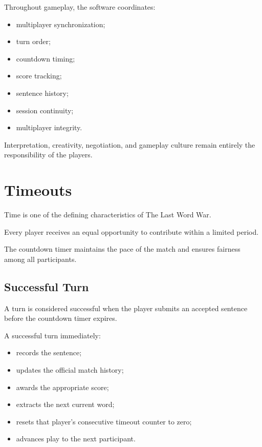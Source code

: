 \documentclass[11pt,a4paper]{article}
\begin{document}
Throughout gameplay, the software coordinates:

\begin{itemize}
    \item multiplayer synchronization;
    \item turn order;
    \item countdown timing;
    \item score tracking;
    \item sentence history;
    \item session continuity;
    \item multiplayer integrity.
\end{itemize}

Interpretation, creativity, negotiation, and gameplay culture remain entirely the responsibility of the players.

\section{Timeouts}
\label{sec:timeouts}

Time is one of the defining characteristics of The Last Word War\texttrademark.

Every player receives an equal opportunity to contribute within a limited period.

The countdown timer maintains the pace of the match and ensures fairness among all participants.

\subsection{Successful Turn}

A turn is considered successful when the player submits an accepted sentence before the countdown timer expires.

A successful turn immediately:

\begin{itemize}
    \item records the sentence;
    \item updates the official match history;
    \item awards the appropriate score;
    \item extracts the next current word;
    \item resets that player's consecutive timeout counter to zero;
    \item advances play to the next participant.
\end{itemize}
\end{document}
